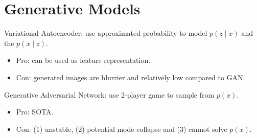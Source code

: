\section{Generative Models}

Variational Autoencoder: use approximated probability to model $p(z \mid x)$ and the $p(x\mid z)$.
\begin{itemize}
    \item Pro: can be used as feature representation.
    \item Con: generated images are blurrier and relatively low compared to GAN.
\end{itemize}

Generative Adversarial Network: use 2-player game to sample from $p(x)$.
\begin{itemize}
    \item Pro: SOTA.
    \item Con: (1) unstable, (2) potential mode collapse and (3) cannot solve $p(x)$.
\end{itemize}